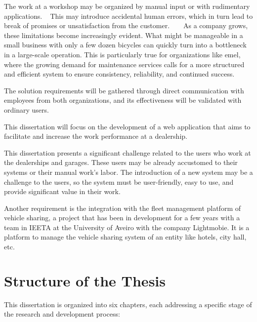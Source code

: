 The work at a workshop may be organized by manual input or with rudimentary applications. ~\cite{MAS_MOTORS} 
This may introduce accidental human errors, which in turn lead to break of promises or unsatisfaction from the customer. ~\cite{MAS_MOTORS} ~\cite{Setting_the_after_sale_process}
As a company grows, these limitations become increasingly evident. What might be manageable in a small business with only a few dozen bicycles can quickly turn into a bottleneck in a large-scale operation. This is particularly true for organizations like \ac{emel}, where the growing demand for maintenance services calls for a more structured and efficient system to ensure consistency, reliability, and continued success.

The solution requirements will be gathered through direct communication with employees from both organizations, and its effectiveness will be validated with ordinary users.

This dissertation will focus on the development of a web application that aims to facilitate and increase the work performance at a dealership. 

This dissertation presents a significant challenge related to the users who work at the dealerships and garages. 
These users may be already accustomed to their systems or their manual work's labor.  
The introduction of a new system may be a challenge to the users, so the system must be user-friendly, easy to use, and provide significant value in their work.

Another requirement is the integration with the fleet management platform of vehicle sharing, a project that has been in development for a few years with a team in \ac{IEETA} at the University of Aveiro with the company Lightmobie.
It is a platform to manage the vehicle sharing system of an entity like hotels, city hall, etc.  



\section{Structure of the Thesis}


This dissertation is organized into six chapters, each addressing a specific stage of the research and development process:


